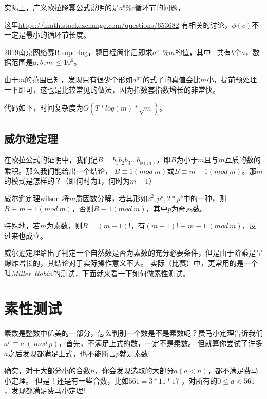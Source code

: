实际上，广义欧拉降幂公式说明的是$a^b\%c$循环节的问题，

这里\href{https://math.stackexchange.com/questions/653682}{https://math.stackexchange.com/questions/653682}
有相关的讨论，$\phi(c)$不一定是最小的循环节长度。

\begin{example}
2019南京网络赛B.superlog，题目经简化后即求$a^{a^{...}} \% m$的值，其中$...$共有$b$个$a$，数据范围是$a,b,m\ \le 10^6$。
\end{example}

由于$m$的范围已知，发现只有很少个形如$a^{a^{...}}$的式子的真值会比$m$小，提前预处理一下即可，这也是比较常见的做法，因为指数套指数增长的非常快。

代码如下，时间复杂度为$O(T*log(m)*\sqrt{m})$。




\subsection{威尔逊定理}
在欧拉公式的证明中，我们记$B=b_1b_2b_3...b_{\phi(m)}$，即$B$为小于$m$且与$m$互质的数的乘积。那么我们能给出一个结论，
$B\equiv 1(mod\ m)$或$B\equiv m-1(mod\ m)$。那$m$的模式是怎样的？（即何时为$1$，何时为$m-1$）

\begin{theorem}{威尔逊定理}{wilson}
	将$m$质因数分解，若其形如$2^2,p^k, 2*p^k$中的一种，则$B\equiv m-1(mod\ m)$，否则$B\equiv 1(mod\ m)$，其中$p$为奇素数。
	
	特殊地，若$m$为素数，则$B=(m-1)!$，有$(m-1)! \equiv m-1 \ (mod\ m)$，反过来也成立。
\end{theorem}

威尔逊定理给出了判定一个{\heiti 自然数是否为素数}的充分必要条件，但是由于阶乘是呈爆炸增长的，其结论对于实际操作意义不大。
实际（比赛）中，更常用的是一个叫$Miller\_Rabin$的测试，下面就来看一下如何做素性测试。

\section{素性测试}
素数是整数中优美的一部分，怎么判别一个数是不是素数呢？费马小定理告诉我们$a^p\equiv a \  (\ mod \ p)$，首先，不满足上式的数，一定不是素数。
但就算你尝试了许多$a$之后发现都满足上式，也不能断言$p$就是素数!

确实，对于大部分小的合数$n$，你会发现选取的大部分$a(a<n)$，都不满足费马小定理。
但是！还是有一些合数，比如$561=3*11*17$ ，对所有的$0\leq a < 561$ ，发现都满足费马小定理!

